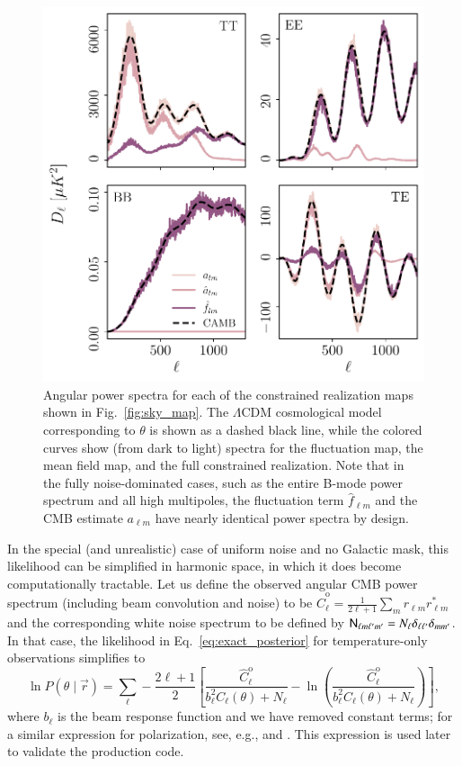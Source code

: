 \documentclass[twocolumn]{../common/aa}
\newcommand{\N}[0]{\tens{N}}
\renewcommand{\r}[0]{\vec{r}}
\begin{document}
\begin{figure}
	\centering
	\includegraphics[width=\linewidth]{figures/sigma_ell.pdf}
	\caption{\label{fig:sigma_ell}Angular power spectra for each of the constrained realization maps shown in Fig.~\ref{fig:sky_map}. The $\Lambda$CDM cosmological model corresponding to $\theta$ is shown as a dashed black line, while the colored curves show (from dark to light) spectra for the fluctuation map, the mean field map, and the full constrained realization. Note that in the fully noise-dominated cases, such as the entire B-mode power spectrum and all high multipoles, the fluctuation term $\hat f_{\ell m}$ and the CMB estimate $a_{\ell m}$ have nearly identical power spectra by design.}
\end{figure}

In the special (and unrealistic) case of uniform noise and no Galactic mask, this likelihood can be simplified in harmonic space, in which it does become computationally tractable. Let us define the observed angular CMB power spectrum (including beam convolution and noise) to be $\hat{C}^{\mathrm{o}}_{\ell} = \frac{1}{2\ell+1}\sum_m r_{\ell m}r^*_{\ell m}$ and the corresponding white noise spectrum to be defined by $\N_{\ell m \ell'm'} = N_\ell \delta_{\ell \ell'}\delta_{mm'}$. In that case, the likelihood in Eq.~\eqref{eq:exact_posterior} for temperature-only observations simplifies to
{\small \begin{equation}
  \ln P(\theta \mid \r) = \sum_{\ell} -\frac{2\ell+1}{2} \left[\frac{\hat{C}^{\mathrm{o}}_{\ell}}{b_\ell^2 C_{\ell}(\theta) + N_\ell}-\ln \left(\frac{\hat{C}^{\mathrm{o}}_{\ell}}{b_\ell^2 C_{\ell}(\theta) + N_\ell} \right) \right],
  \label{eq:exact_harm} \end{equation}}
where $b_\ell$ is the beam response function and we have removed constant terms; for a similar expression for polarization, see, e.g., \citet{larson:2006} and \citet{Hamimeche:2008ai}. This expression is used later to validate the production code.
\end{document}
